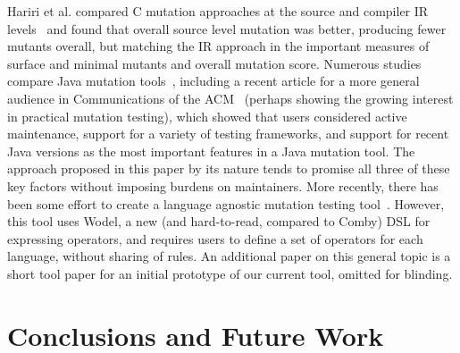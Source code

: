 \documentclass[acmsmall,screen,review,anonymous]{acmart}
\begin{document}
{Hariri et al. compared C mutation approaches at the source and
compiler IR levels~\cite{CompareSrcBinary} and found that overall
source level mutation was better, producing fewer mutants overall, but
matching the IR approach in the important measures of surface and
minimal mutants and overall mutation score.  Numerous studies compare
Java mutation tools~\cite{MajorPIT,gopinath2017does}, including a
recent article for a more general audience in Communications of the
ACM~\cite{CommACMJavaTool} (perhaps showing the growing interest in
practical mutation testing), which showed that users
considered active maintenance, support for a variety of testing
frameworks, and support for recent Java versions as the most important
features in a Java mutation tool.  The approach proposed in this paper
by its nature tends to promise all three of these key factors without
imposing burdens on maintainers. More recently, there has been some effort to create a 
language agnostic mutation testing tool~\cite{wodeltest}.  However, this tool uses
Wodel, a new (and hard-to-read, compared to Comby) DSL for expressing operators, and requires users to
define a set of operators for each language, without sharing  
of rules.  An
  additional paper on this general topic is a short tool paper for an initial
  prototype of our current tool, omitted for blinding. 



\section{Conclusions and Future Work}

}
\end{document}
